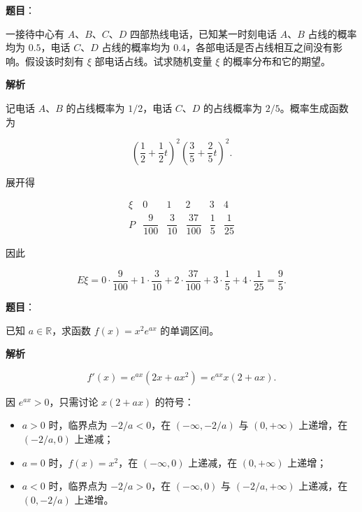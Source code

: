 \begin{answer}

\textbf{题目}：

一接待中心有 $A\text{、}B\text{、}C\text{、}D$ 四部热线电话，已知某一时刻电话 $A\text{、}B$ 占线的概率均为 $0.5$，电话 $C\text{、}D$ 占线的概率均为 $0.4$，各部电话是否占线相互之间没有影响。假设该时刻有 $\xi$ 部电话占线。试求随机变量 $\xi$ 的概率分布和它的期望。

\textbf{解析}

记电话 $A\text{、}B$ 的占线概率为 $1/2$，电话 $C\text{、}D$ 的占线概率为 $2/5$。概率生成函数为

\nopagebreak[4]
\[
\left(\frac12+\frac12t\right)^2
\left(\frac35+\frac25t\right)^2.
\]

展开得

\nopagebreak[4]
\[
\begin{array}{c|ccccc}
\xi&0&1&2&3&4\\
\hline
P&\dfrac9{100}&\dfrac3{10}&\dfrac{37}{100}&\dfrac15&\dfrac1{25}
\end{array}
\]

因此

\nopagebreak[4]
\[
E\xi=0\cdot\frac9{100}+1\cdot\frac3{10}
+2\cdot\frac{37}{100}+3\cdot\frac15+4\cdot\frac1{25}
=\frac95.
\]


\end{answer}
\begin{answer}

\textbf{题目}：

已知 $a\in\mathbb R$，求函数 $f(x)=x^2e^{ax}$ 的单调区间。

\textbf{解析}

\nopagebreak[4]
\[
f'(x)=e^{ax}(2x+ax^2)=e^{ax}x(2+ax).
\]

因 $e^{ax}>0$，只需讨论 $x(2+ax)$ 的符号：

\begin{itemize}
\item $a>0$ 时，临界点为 $-2/a<0$，在 $\left(-\infty,-2/a\right)$ 与 $(0,+\infty)$ 上递增，在 $\left(-2/a,0\right)$ 上递减；
\item $a=0$ 时，$f(x)=x^2$，在 $(-\infty,0)$ 上递减，在 $(0,+\infty)$ 上递增；
\item $a<0$ 时，临界点为 $-2/a>0$，在 $(-\infty,0)$ 与 $\left(-2/a,+\infty\right)$ 上递减，在 $\left(0,-2/a\right)$ 上递增。
\end{itemize}


\end{answer}
